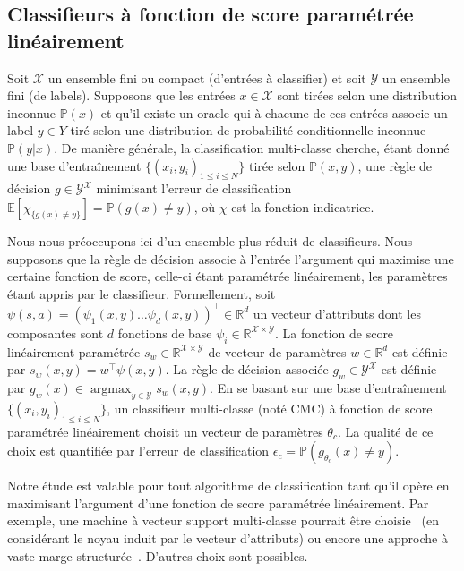 \documentclass[french,utf8]{./hermes-journal}
\newcommand{\argmax}{\operatorname*{argmax}} %
\newcommand{\X}{\mathcal{X}}
\newcommand{\Y}{\mathcal{Y}}
\newcommand{\E}{\mathbb{E}}
\newcommand{\prob}{\mathbb{P}}
\begin{document}
\subsection{Classifieurs à fonction de score paramétrée linéairement} \label{subseackgrounlassif}

Soit $\X$ un ensemble fini ou compact (d'entrées à classifier)
 et soit $\Y$ un ensemble fini (de labels). Supposons que les entrées $x\in
\X$ sont tirées selon une distribution inconnue $\prob(x)$ et qu'il existe un oracle qui à chacune de ces entrées associe un label $y\in Y$ tiré selon une distribution de probabilité conditionnelle inconnue $\prob(y|x)$. De manière générale, la classification multi-classe cherche, étant donné une base d'entraînement $\{(x_i,y_i)_{1\leq i \leq N}\}$ tirée selon $\prob(x,y)$, une règle de décision $g\in\Y^\X$ minimisant l'erreur de classification $\E[\chi_{\{g(x)\neq y\}}] = \prob(g(x)\neq y)$, où $\chi$ est la fonction indicatrice.

Nous nous préoccupons ici d'un ensemble plus réduit de classifieurs. Nous supposons que la règle de décision associe à l'entrée l'argument qui maximise une certaine fonction de score, celle-ci étant paramétrée linéairement, les paramètres étant appris par le classifieur. Formellement, soit $\psi(s,a) =
(\psi_1(x,y)  \dots  \psi_d(x,y))^\top\in \mathbb{R}^d$
un vecteur d'attributs dont les composantes sont $d$ fonctions de base $\psi_i\in\mathbb{R}^{\X\times\Y}$. La fonction de score linéairement paramétrée $s_w\in\mathbb{R}^{\X\times \Y}$ de vecteur de paramètres $w\in\mathbb{R}^d$ est définie par $s_w(x,y) = w^\top \psi(x,y)$. La règle de décision associée $g_w\in{\Y^\X}$ est définie par $g_w(x) \in \argmax_{y\in\Y}s_w(x,y)$. En se basant sur une base d'entraînement $\{(x_i,y_i)_{1\leq
i\leq N}\}$, un classifieur multi-classe (noté CMC) à fonction de score paramétrée linéairement choisit un vecteur de paramètres $\theta_c$. La qualité de ce choix est quantifiée par l'erreur de classification $\epsilon_c =
\prob(g_{\theta_c}(x)\neq y)$. %

Notre étude est valable pour tout algorithme de classification tant qu'il opère en maximisant l'argument d'une fonction de score paramétrée linéairement. Par exemple, une machine à vecteur support multi-classe pourrait être choisie~\cite{Guermeu007} (en considérant le noyau induit par le vecteur d'attributs) ou encore une approche à vaste marge structurée~\cite{Taska005}. D'autres choix sont possibles.
\end{document}
